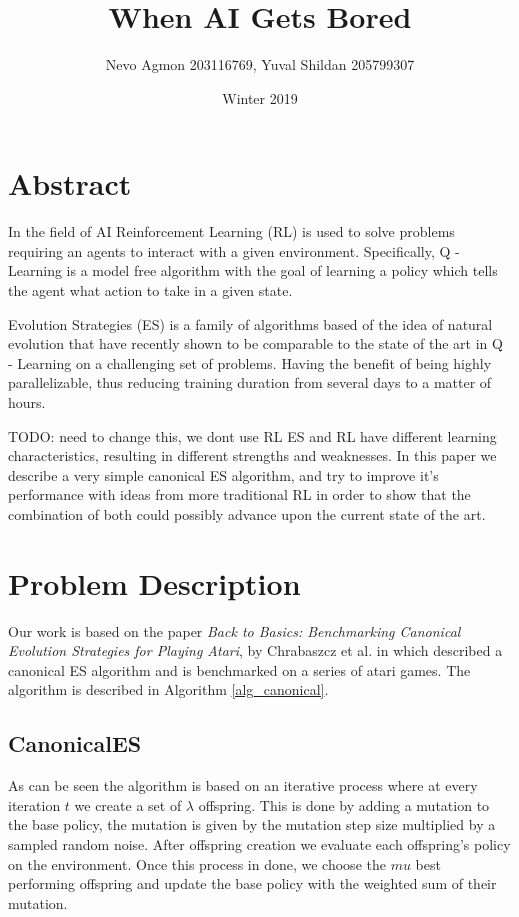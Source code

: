 \documentclass[11 pt, twocolumn]{article}
\title{When AI Gets Bored}
\author{Nevo Agmon 203116769, Yuval Shildan 205799307}
\date{Winter 2019}
\newcommand{\todo}[1]{}
\renewcommand{\todo}[1]{{\color{red} TODO: {#1}}}
\begin{document}
\maketitle
\section{Abstract}
In the field of AI Reinforcement Learning (RL) is used to solve problems requiring an agents to interact with a given environment. Specifically, Q - Learning is a model free algorithm with the goal of learning a policy which tells the agent what action to take in a given state.

Evolution Strategies (ES) is a family of algorithms based of the idea of natural evolution that have recently shown to be comparable to the state of the art in Q - Learning on a challenging set of problems. Having the benefit of being highly parallelizable, thus reducing training duration from several days to a matter of hours.

\todo{need to change this, we dont use RL} ES and RL have different learning characteristics, resulting in different strengths and weaknesses. In this paper we describe a very simple canonical ES algorithm, and try to improve it's performance with ideas from more traditional RL in order to show that the combination of both could possibly advance upon the current state of the art.


\section{Problem Description}
Our work is based on the paper \emph{Back to Basics: Benchmarking Canonical Evolution Strategies for  Playing Atari}, by Chrabaszcz et al. \cite{canonical} in which described a canonical ES algorithm and is benchmarked on a series of atari games. The algorithm is described in Algorithm \ref{alg_canonical}.

\subsection{CanonicalES}
As can be seen the algorithm is based on an iterative process where at every iteration $t$ we create a set of $\lambda$ offspring. This is done by adding a mutation to the base policy, the mutation is given by the mutation step size multiplied by a sampled random noise. After offspring creation we evaluate each offspring's policy on the environment. Once this process in done, we choose the $mu$ best performing offspring and update the base policy with the weighted sum of their mutation.
\end{document}
